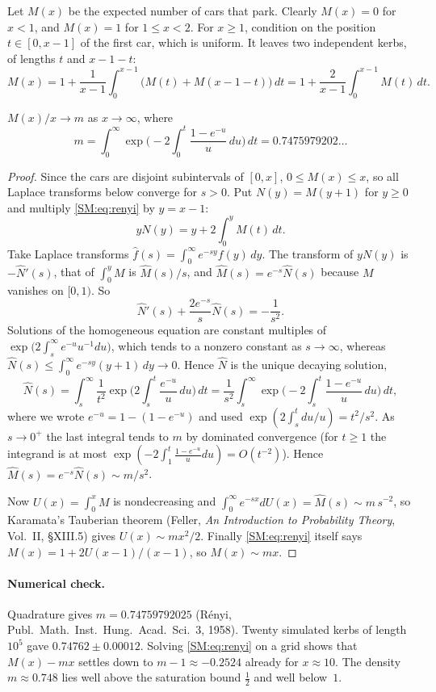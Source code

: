 Let $M(x)$ be the expected number of cars that park. Clearly $M(x)=0$ for $x<1$, and $M(x)=1$ for
$1\le x<2$. For $x\ge1$, condition on the position $t\in[0,x-1]$ of the first car, which is uniform. It
leaves two independent kerbs, of lengths $t$ and $x-1-t$:
\begin{equation}\label{SM:eq:renyi}
  M(x)=1+\frac1{x-1}\int_0^{x-1}\big(M(t)+M(x-1-t)\big)\,dt=1+\frac2{x-1}\int_0^{x-1}M(t)\,dt .
\end{equation}

\begin{theorem}[R\'enyi 1958]\label{SM:thm:renyi}
$M(x)/x\to m$ as $x\to\infty$, where
\[
  m=\int_0^\infty\exp\Big(-2\int_0^t\frac{1-e^{-u}}{u}\,du\Big)\,dt=0.7475979202\ldots
\]
\end{theorem}

\begin{proof}
Since the cars are disjoint subintervals of $[0,x]$, $0\le M(x)\le x$, so all Laplace transforms below
converge for $s>0$. Put $N(y)=M(y+1)$ for $y\ge0$ and multiply \eqref{SM:eq:renyi} by $y=x-1$:
\[
  yN(y)=y+2\int_0^yM(t)\,dt .
\]
Take Laplace transforms $\hat f(s)=\int_0^\infty e^{-sy}f(y)\,dy$. The transform of $yN(y)$ is
$-\hat N'(s)$, that of $\int_0^yM$ is $\hat M(s)/s$, and $\hat M(s)=e^{-s}\hat N(s)$ because $M$ vanishes on
$[0,1)$. So
\[
  \hat N'(s)+\frac{2e^{-s}}{s}\hat N(s)=-\frac1{s^2}.
\]
Solutions of the homogeneous equation are constant multiples of $\exp\big(2\int_s^\infty e^{-u}u^{-1}du\big)$,
which tends to a nonzero constant as $s\to\infty$, whereas $\hat N(s)\le\int_0^\infty e^{-sy}(y+1)\,dy\to0$. Hence
$\hat N$ is the unique decaying solution,
\[
  \hat N(s)=\int_s^\infty\frac{1}{t^2}\exp\Big(2\int_s^t\frac{e^{-u}}u\,du\Big)\,dt
  =\frac1{s^2}\int_s^\infty\exp\Big(-2\int_s^t\frac{1-e^{-u}}u\,du\Big)\,dt,
\]
where we wrote $e^{-u}=1-(1-e^{-u})$ and used $\exp(2\int_s^t du/u)=t^2/s^2$. As $s\to0^+$ the last
integral tends to $m$ by dominated convergence (for $t\ge1$ the integrand is at most
$\exp(-2\int_1^t\frac{1-e^{-u}}u du)=O(t^{-2})$). Hence $\hat M(s)=e^{-s}\hat N(s)\sim m/s^2$.

Now $U(x)=\int_0^xM$ is nondecreasing and $\int_0^\infty e^{-sx}dU(x)=\hat M(s)\sim m\,s^{-2}$, so Karamata's
Tauberian theorem (Feller, \emph{An Introduction to Probability Theory}, Vol.~II, \S XIII.5) gives
$U(x)\sim mx^2/2$. Finally \eqref{SM:eq:renyi} itself says $M(x)=1+2U(x-1)/(x-1)$, so $M(x)\sim mx$.
\end{proof}

\paragraph{Numerical check.} Quadrature gives $m=0.74759792025$ (R\'enyi, Publ.\ Math.\ Inst.\ Hung.\
Acad.\ Sci.\ 3, 1958). Twenty simulated kerbs of length $10^5$ gave
$0.74762\pm0.00012$. Solving \eqref{SM:eq:renyi} on a grid shows that $M(x)-mx$ settles down to
$m-1\approx-0.2524$ already for $x\approx10$. The density $m\approx0.748$ lies well above the saturation
bound $\frac12$ and well below~$1$.


